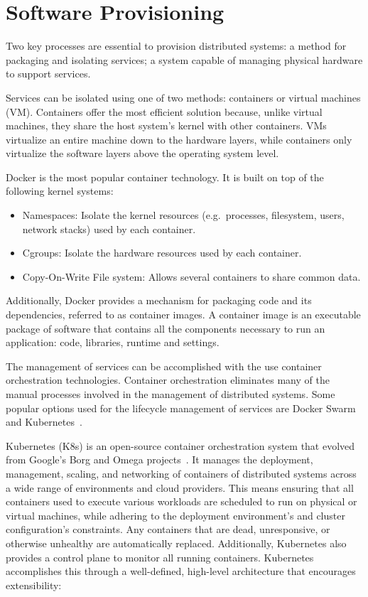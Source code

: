 \section{Software Provisioning} %
\label{sec:software_provisioning}

Two key processes are essential to provision distributed systems:
a method for packaging and isolating services;
a system capable of managing physical hardware to support services.

Services can be isolated using one of two methods: containers or virtual machines (VM).
Containers offer the most efficient solution because, unlike virtual machines, they share the host system's kernel with other containers.
VMs virtualize an entire machine down to the hardware layers, while containers only virtualize the software layers above the operating system level.

Docker \cite{docker} is the most popular container technology.
It is built on top of the following kernel systems:
\begin{itemize}
    \setlength\itemsep{0em}
    \item Namespaces: Isolate the kernel resources (e.g.\ processes, filesystem, users, network stacks) used by each container.
    \item Cgroups: Isolate the hardware resources used by each container.
    \item Copy-On-Write File system: Allows several containers to share common data.
\end{itemize}

Additionally, Docker provides a mechanism for packaging code and its dependencies, referred to as container images.
A container image is an executable package of software that contains all the components necessary to run an application: code, libraries, runtime and settings.

The management of services can be accomplished with the use container orchestration technologies.
Container orchestration eliminates many of the manual processes involved in the management of distributed systems.
Some popular options used for the lifecycle management of services are Docker Swarm~\cite{docker2016swarm} and Kubernetes~\cite{kubernetes}.

Kubernetes (K8s) is an open-source container orchestration system that evolved from Google's Borg and Omega projects~\cite{kubernetes}.
It manages the deployment, management, scaling, and networking of containers of distributed systems across a wide range of environments
and cloud providers.
This means ensuring that all containers used to execute various workloads are scheduled to run on physical or virtual machines,
while adhering to the deployment environment's and cluster configuration's constraints.
Any containers that are dead, unresponsive, or otherwise unhealthy are automatically replaced.
Additionally, Kubernetes also provides a control plane to monitor all running containers.
Kubernetes accomplishes this through a well-defined, high-level architecture that encourages extensibility:

